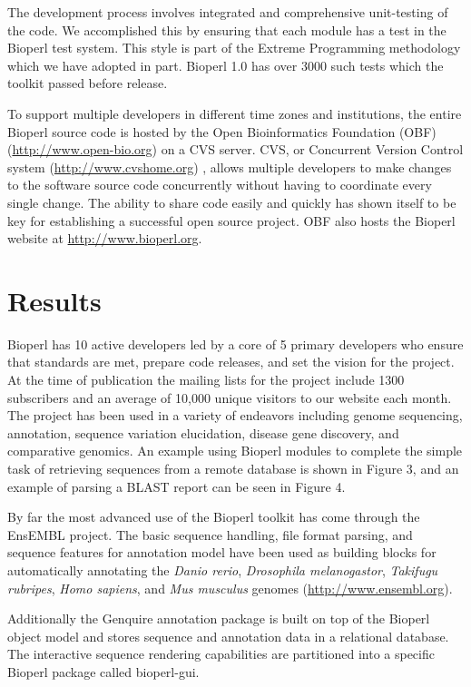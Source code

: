 \documentclass[12pt]{article}
\begin{document}
The development process involves integrated and comprehensive
unit-testing of the code.  We accomplished this by ensuring that each
module has a test in the Bioperl test system.  This style is part of
the Extreme Programming methodology \cite{xprogramming} which we have
adopted in part.  Bioperl 1.0 has over 3000 such tests which the toolkit
passed before release.

To support multiple developers in different time zones and
institutions, the entire Bioperl source code is hosted by the Open
Bioinformatics Foundation (OBF) (\url{http://www.open-bio.org}) on a
CVS server.  CVS, or Concurrent Version Control system
(\url{http://www.cvshome.org}) \cite{cvsbook}, allows multiple
developers to make changes to the software source code concurrently
without having to coordinate every single change.  The ability to
share code easily and quickly has shown itself to be key for
establishing a successful open source project.  OBF also hosts the
Bioperl website at \url{http://www.bioperl.org}.

\section{Results}

Bioperl has 10 active developers led by a core of 5 primary developers
who ensure that standards are met, prepare code releases, and set the
vision for the project.  At the time of publication the mailing lists
for the project include 1300 subscribers and an average of 10,000
unique visitors to our website each month.  The project has been used
in a variety of endeavors including genome sequencing, annotation,
sequence variation elucidation, disease gene discovery, and
comparative genomics.  An example using Bioperl modules to complete
the simple task of retrieving sequences from a remote database is
shown in Figure 3, and an example of parsing a BLAST report can be
seen in Figure 4.

By far the most advanced use of the Bioperl toolkit has come through
the EnsEMBL \cite{ensembl-nar} project.  The basic sequence handling,
file format parsing, and sequence features for annotation model have
been used as building blocks for automatically annotating the
\textit{Danio rerio}, \textit{Drosophila melanogastor},
\textit{Takifugu rubripes}, \textit{Homo sapiens}, and \textit{Mus
musculus} genomes (\url{http://www.ensembl.org}).

Additionally the Genquire \cite{genquire} annotation package is built
on top of the Bioperl object model and stores sequence and annotation
data in a relational database.  The interactive sequence rendering
capabilities are partitioned into a specific Bioperl package called
bioperl-gui.
\end{document}
